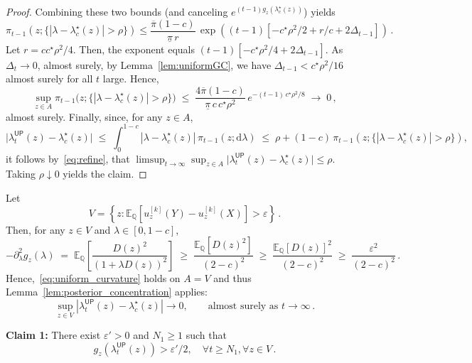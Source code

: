 \documentclass[12pt,twoside]{article}
\theoremstyle{plain}
\theoremstyle{definition}
\theoremstyle{remark}
\newcommand{\Esymb}{\mathbb{E}}
\newcommand{\Qsymb}{\mathbb{Q}}
\newcommand{\Ex}[2]{\Esymb_{{#1}}\left[{#2}\right]}
\newcommand{\fbet}{\lambda}  %
\newcommand{\up}{\mathsf{UP}}
\renewcommand{\epsilon}{\varepsilon}
\begin{document}
\begin{proof}
Combining these two bounds (and canceling
$e^{(t-1)g_z(\fbet^\star_c(z))}$) yields
\begin{equation*}
    \pi_{t-1}\left(z;\{|\lambda-\fbet^\star_c(z)|>\rho\}\right)
   \leq\frac{\overline\pi(1-c)}{\underline\pi\, r}\,
    \exp\left((t-1)[-c^\star\rho^2/2 + r/c + 2\Delta_{t-1}]\right)\,.
\end{equation*}
Let $r = cc^\star\rho^2/4$. Then, the
exponent equals $(t-1)[-c^\star\rho^2/4+2\Delta_{t-1}]$. As $\Delta_t\to0$, almost surely, by Lemma~\ref{lem:uniformGC}, we have
$\Delta_{t-1}<c^\star\rho^2/16$ almost surely for all $t$ large. Hence,
\begin{equation}\label{eq:refine}
    \sup_{z\in A}\pi_{t-1}\bigl(z;\{|\lambda-\fbet^\star_c(z)|>\rho\}\bigr)
    \;\le\;\frac{4\overline\pi(1-c)}{\underline\pi\, c\, c^\star\rho^2}\,
    e^{-(t-1)\,c^\star\rho^2/8}\;\to\;0\,,
\end{equation}
almost surely. Finally, since, for any $z\in A$,
\begin{equation*}
    \bigl|\fbet_t^\up(z)-\fbet^\star_c(z)\bigr|
    \;\le\; \int_0^{1-c}|\lambda-\fbet^\star_c(z)|\,\pi_{t-1}(z;\mathrm{d}\lambda)
    \;\le\; \rho + (1-c)\,\pi_{t-1}(z;\{|\lambda-\fbet^\star_c(z)|>\rho\}),
\end{equation*}
it follows by~\eqref{eq:refine}, that $\limsup_{t\to\infty} \sup_{z\in A}|\fbet_t^\up(z)-\fbet^\star_c(z)\bigr| \leq \rho.$ Taking $\rho\downarrow 0$ yields the claim.
\end{proof}

Let
\begin{equation*}
    V=\left\{z:\Ex{\Qsymb}{{u}_z^{[k]}(Y)-{u}_z^{[k]}(X)}> \epsilon\right\}\,.
\end{equation*}
Then, for any $z\in V$ and $\lambda\in[0,1-c]$,
\begin{equation*}
    -\partial_\lambda^2 g_z(\lambda)
    \;=\;\Ex{\Qsymb}{\frac{D(z)^2}{(1+\lambda D(z))^2}}
    \;\ge\;\frac{\Ex{\Qsymb}{D(z)^2}}{(2-c)^2}
    \;\ge\;\frac{\Ex{\Qsymb}{D(z)}^2}{(2-c)^2}
    \;\ge\;\frac{\varepsilon^2}{(2-c)^2}\,.
\end{equation*}
Hence,~\eqref{eq:uniform_curvature} holds on $A=V$ and thus
Lemma~\ref{lem:posterior_concentration} applies:
\begin{equation}\label{eq:uniform_conv_V}
    \sup_{z\in V}\left|\fbet_t^\up(z)-\fbet^\star_c(z)\right|\to0,
    \qquad\text{almost surely as }t\to\infty\,.
\end{equation}

\textbf{Claim 1:} There exist $\varepsilon'>0$
and $N_1\ge 1$ such that \begin{equation*}
    g_z(\fbet_t^\up(z))>\varepsilon'/2, \quad \forall t\geq N_1, \forall z\in V\,.
\end{equation*}
\end{document}
